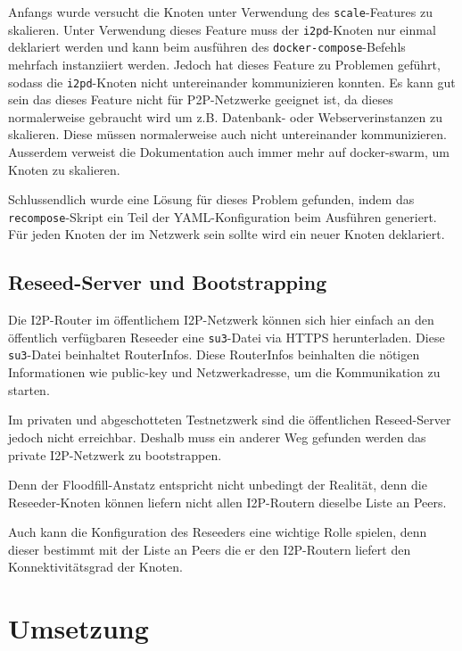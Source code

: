 Anfangs wurde versucht die Knoten unter Verwendung des \lstinline|scale|-Features zu skalieren.
Unter Verwendung dieses Feature muss der \lstinline|i2pd|-Knoten nur einmal deklariert werden und kann beim ausführen des \lstinline|docker-compose|-Befehls mehrfach instanziiert werden.
Jedoch hat dieses Feature zu Problemen geführt, sodass die \lstinline|i2pd|-Knoten nicht untereinander kommunizieren konnten.
Es kann gut sein das dieses Feature nicht für P2P-Netzwerke geeignet ist, da dieses normalerweise gebraucht wird um z.B. Datenbank- oder Webserverinstanzen zu skalieren.
Diese müssen normalerweise auch nicht untereinander kommunizieren.
Ausserdem verweist die Dokumentation auch immer mehr auf docker-swarm, um Knoten zu skalieren.

Schlussendlich wurde eine Lösung für dieses Problem gefunden,
indem das \lstinline|recompose|-Skript ein Teil der YAML-Konfiguration beim Ausführen generiert.
Für jeden Knoten der im Netzwerk sein sollte wird ein neuer Knoten deklariert.


\subsection{Reseed-Server und Bootstrapping}

Die I2P-Router im öffentlichem I2P-Netzwerk können sich hier einfach an den öffentlich verfügbaren Reseeder eine \lstinline|su3|-Datei via HTTPS herunterladen.
Diese \lstinline|su3|-Datei beinhaltet RouterInfos. 
Diese RouterInfos beinhalten die nötigen Informationen wie public-key und Netzwerkadresse, um die Kommunikation zu starten.

Im privaten und abgeschotteten Testnetzwerk sind die öffentlichen Reseed-Server jedoch nicht erreichbar.
Deshalb muss ein anderer Weg gefunden werden das private I2P-Netzwerk zu bootstrappen.

Denn der Floodfill-Anstatz entspricht nicht unbedingt der Realität, denn die Reseeder-Knoten können liefern nicht allen I2P-Routern dieselbe Liste an Peers.

Auch kann die Konfiguration des Reseeders eine wichtige Rolle spielen, denn dieser bestimmt mit der Liste an Peers die er den I2P-Routern liefert den Konnektivitätsgrad der Knoten.

\section{Umsetzung}\label{sec:umsetzung}

